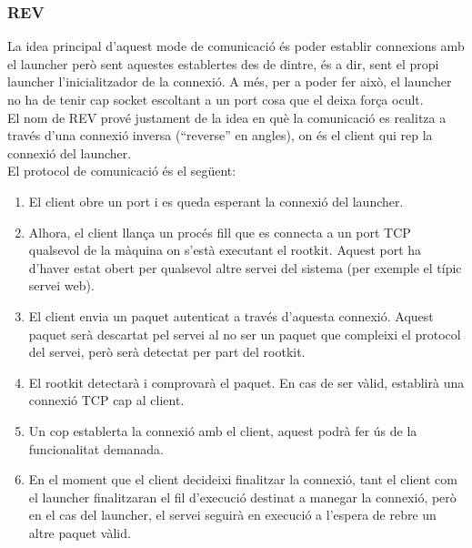 \subsubsection{REV}

La idea principal d'aquest mode de comunicació és poder establir connexions amb el launcher però sent 
aquestes establertes des de dintre, és a dir, sent el propi launcher l'inicialitzador de la connexió. A més, per a
poder fer això, el launcher no ha de tenir cap socket escoltant a un port cosa que el deixa força ocult. \\

El nom de REV prové justament de la idea en què la comunicació es realitza a través d'una connexió inversa
(``reverse'' en angles), on és el client qui rep la connexió del launcher. \\

El protocol de comunicació és el següent: \\

\begin{enumerate}
    \item El client obre un port i es queda esperant la connexió del launcher.
    \item Alhora, el client llança un procés fill que es connecta a un port TCP qualsevol de la màquina on s'està 
        executant el rootkit. Aquest port ha d'haver estat obert per qualsevol altre servei del sistema (per 
        exemple el típic servei web).
    \item El client envia un paquet autenticat a través d'aquesta connexió. Aquest paquet serà   
        descartat pel servei al no ser un paquet que compleixi el protocol del servei, però serà detectat per
        part del rootkit. 
    \item El rootkit detectarà i comprovarà el paquet. En cas de ser vàlid, establirà una connexió TCP cap 
        al client.
    \item Un cop establerta la connexió amb el client, aquest podrà fer ús de la funcionalitat demanada. 
    \item En el moment que el client decideixi finalitzar la connexió, tant el client com el launcher finalitzaran el
        fil d'execució destinat a manegar la connexió, però en el cas del launcher, el servei seguirà en execució
        a l'espera de rebre un altre paquet vàlid.
\end{enumerate}


